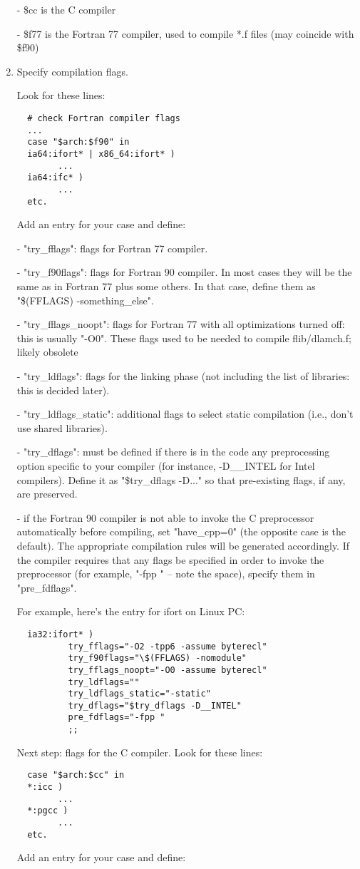 \documentclass[12pt,a4paper]{article}
\begin{document}
\begin{enumerate}
- \$cc is the C compiler

- \$f77 is the Fortran 77 compiler, used to compile *.f files
(may coincide with \$f90)

\item Specify compilation flags.

Look for these lines:
\begin{verbatim}
  # check Fortran compiler flags
  ...
  case "$arch:$f90" in
  ia64:ifort* | x86_64:ifort* )
        ...
  ia64:ifc* )
        ...
  etc.
\end{verbatim}
Add an entry for your case and define:

- "try\_fflags": flags for Fortran 77 compiler.

- "try\_f90flags": flags for Fortran 90 compiler.
In most cases they will be the same as in Fortran 77 plus some
others.  In that case, define them as "\$(FFLAGS) -something\_else".

- "try\_fflags\_noopt": flags for Fortran 77 with all optimizations
turned off: this is usually "-O0".
These flags used to be needed to compile flib/dlamch.f; likely obsolete

- "try\_ldflags": flags for the linking phase (not including the list
of libraries: this is decided later).

- "try\_ldflags\_static": additional flags to select static compilation
(i.e., don't use shared libraries).

- "try\_dflags": must be defined if there is in the code any preprocessing
option specific to your compiler (for instance, -D\_\_INTEL for Intel
compilers).  Define it as "\$try\_dflags -D..." so that pre-existing
flags, if any, are preserved.

- if the Fortran 90 compiler is not able to invoke the C preprocessor
automatically before compiling, set "have\_cpp=0" (the opposite case
is the default). The appropriate compilation rules will be generated
accordingly. If the compiler requires that any flags be specified in
order to invoke the preprocessor (for example, "-fpp " -- note the
space), specify them in "pre\_fdflags".

For example, here's the entry for ifort on Linux PC:
\begin{verbatim}
  ia32:ifort* )
          try_fflags="-O2 -tpp6 -assume byterecl"
          try_f90flags="\$(FFLAGS) -nomodule"
          try_fflags_noopt="-O0 -assume byterecl"
          try_ldflags=""
          try_ldflags_static="-static"
          try_dflags="$try_dflags -D__INTEL"
          pre_fdflags="-fpp "
          ;;
\end{verbatim}
Next step: flags for the C compiler. Look for these lines:
\begin{verbatim}
  case "$arch:$cc" in
  *:icc )
        ...
  *:pgcc )
        ...
  etc.
\end{verbatim}
Add an entry for your case and define:


\end{enumerate}
\end{document}
